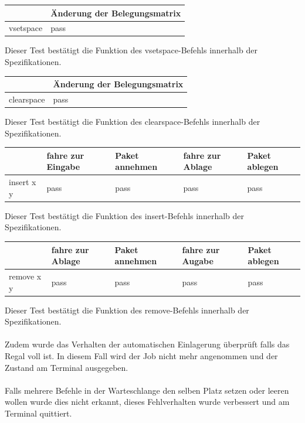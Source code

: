 \begin{tabular}{|l|l|}
\hline
         	& Änderung der Belegungsmatrix\\
\hline
vsetspace & pass\\
\hline
\end{tabular}

Dieser Test bestätigt die Funktion des vsetspace-Befehls innerhalb der Spezifikationen.
\newline

\begin{tabular}{|l|l|}
\hline
         	& Änderung der Belegungsmatrix\\
\hline
clearspace & pass\\
\hline
\end{tabular}

Dieser Test bestätigt die Funktion des clearspace-Befehls innerhalb der Spezifikationen.
\newline


\begin{tabular}{|l|l|l|l|l|}
\hline
         	&  fahre zur Eingabe & Paket annehmen   & fahre zur Ablage & Paket ablegen\\
\hline
insert x y & pass & pass & pass & pass\\
\hline
\end{tabular}

Dieser Test bestätigt die Funktion des insert-Befehls innerhalb der Spezifikationen.
\newline

\begin{tabular}{|l|l|l|l|l|}
\hline
         	&  fahre zur Ablage & Paket annehmen   & fahre zur Augabe & Paket ablegen\\
\hline
remove x y & pass & pass & pass & pass\\
\hline
\end{tabular}

Dieser Test bestätigt die Funktion des remove-Befehls innerhalb der Spezifikationen.\\
\\
Zudem wurde das Verhalten der automatischen Einlagerung überprüft falls das Regal voll ist. In diesem Fall wird der Job nicht mehr angenommen und der Zustand am Terminal ausgegeben.\\
\\
Falls mehrere Befehle in der Warteschlange den selben Platz setzen oder leeren wollen wurde dies nicht erkannt, dieses Fehlverhalten wurde verbessert  und am Terminal quittiert.


